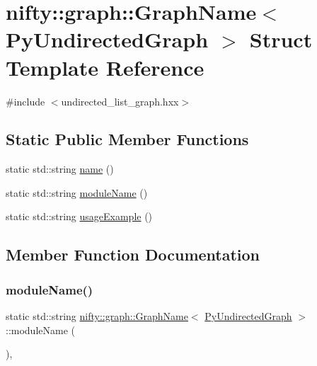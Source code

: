 \hypertarget{structnifty_1_1graph_1_1GraphName_3_01PyUndirectedGraph_01_4}{}\section{nifty\+:\+:graph\+:\+:Graph\+Name$<$ Py\+Undirected\+Graph $>$ Struct Template Reference}
\label{structnifty_1_1graph_1_1GraphName_3_01PyUndirectedGraph_01_4}


{\ttfamily \#include $<$undirected\+\_\+list\+\_\+graph.\+hxx$>$}

\subsection*{Static Public Member Functions}
\begin{DoxyCompactItemize}
\item 
static std\+::string \hyperlink{structnifty_1_1graph_1_1GraphName_3_01PyUndirectedGraph_01_4_a36e0e5cf6d601ab8e63d65180dc4162a}{name} ()
\item 
static std\+::string \hyperlink{structnifty_1_1graph_1_1GraphName_3_01PyUndirectedGraph_01_4_ac62155ccd2721d709ee743039e42be0b}{module\+Name} ()
\item 
static std\+::string \hyperlink{structnifty_1_1graph_1_1GraphName_3_01PyUndirectedGraph_01_4_aec70e4ad4be73906f4b2fd6723c33a1d}{usage\+Example} ()
\end{DoxyCompactItemize}


\subsection{Member Function Documentation}
\mbox{\label{structnifty_1_1graph_1_1GraphName_3_01PyUndirectedGraph_01_4_ac62155ccd2721d709ee743039e42be0b}} 
\subsubsection{\texorpdfstring{module\+Name()}{moduleName()}}
{\footnotesize\ttfamily static std\+::string \hyperlink{structnifty_1_1graph_1_1GraphName}{nifty\+::graph\+::\+Graph\+Name}$<$ \hyperlink{namespacenifty_1_1graph_a62ff5304d118f627910196adc6ab7aab}{Py\+Undirected\+Graph} $>$\+::module\+Name (\begin{DoxyParamCaption}{ }\end{DoxyParamCaption})\hspace{0.3cm}{\ttfamily [inline]}, {\ttfamily [static]}}

